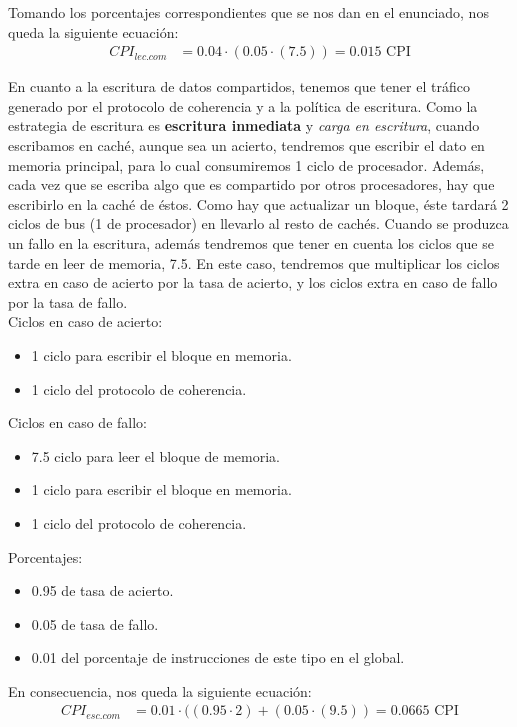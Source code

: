 \documentclass[12pt,a4paper]{article}
\begin{document}
Tomando los porcentajes correspondientes que se nos dan en el enunciado, nos queda la siguiente ecuación:
\begin{align*}
CPI_{lec.com}&=0.04\cdot (0.05\cdot (7.5))=0.015\text{ CPI}
\end{align*}

En cuanto a la escritura de datos compartidos, tenemos que tener el tráfico generado por el protocolo de coherencia y a la política de escritura. Como la estrategia de escritura es \textbf{escritura inmediata} y \textit{carga en escritura}, cuando escribamos en caché, aunque sea un acierto, tendremos que escribir el dato en memoria principal, para lo cual consumiremos 1 ciclo de procesador. Además, cada vez que se escriba algo que es compartido por otros procesadores, hay que escribirlo en la caché de éstos. Como hay que actualizar un bloque, éste tardará 2 ciclos de bus (1 de procesador) en llevarlo al resto de cachés. Cuando se produzca un fallo en la escritura, además tendremos que tener en cuenta los ciclos que se tarde en leer de memoria, 7.5. En este caso, tendremos que multiplicar los ciclos extra en caso de acierto por la tasa de acierto, y los ciclos extra en caso de fallo por la tasa de fallo.\\

Ciclos en caso de acierto:
\begin{itemize}
\item 1 ciclo para escribir el bloque en memoria.
\item 1 ciclo del protocolo de coherencia.
\end{itemize}

Ciclos en caso de fallo:
\begin{itemize}
\item 7.5 ciclo para leer el bloque de memoria.
\item 1 ciclo para escribir el bloque en memoria.
\item 1 ciclo del protocolo de coherencia.
\end{itemize}

Porcentajes:
\begin{itemize}
\item 0.95 de tasa de acierto.
\item 0.05 de tasa de fallo.
\item 0.01 del porcentaje de instrucciones de este tipo en el global.
\end{itemize}

En consecuencia, nos queda la siguiente ecuación:
\begin{align*}
CPI_{esc.com}&=0.01\cdot ((0.95\cdot 2)+(0.05\cdot (9.5))=0.0665\text{ CPI}
\end{align*}
\end{document}
